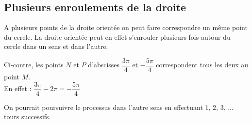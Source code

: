     \subsection{Plusieurs enroulements de la droite}
        \begin{minipage}{0.75\linewidth}
            A plusieurs points de la droite orientée on peut faire correspondre un même point du cercle. La droite orientée peut en effet s'enrouler plusieurs fois autour du cercle dans un sens et dans l'autre.\\
            \begin{bexemples}
            \begin{itemEx}
                \item Ci-contre, les points $N$ et $P$ d'abscisses $\dfrac{3\pi}{4}$ et $-\dfrac{5\pi}{4}$ correspondent tous les deux au point $M$.\\ 
                En effet : $\dfrac{3\pi}{4} -2\pi= -\dfrac{5\pi}{4}$
                \item On pourrait poursuivre le processus dans l'autre sens en effectuant 1, 2, 3, ... tours successifs.\\ 
            \end{itemEx}
        \end{bexemples}
        \end{minipage} \hfill
